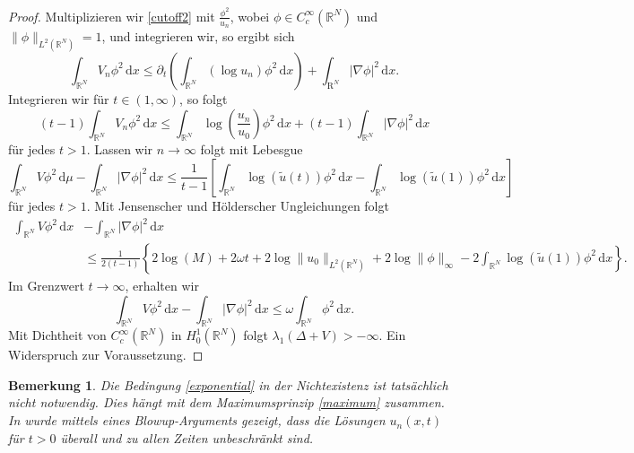 \documentclass[11pt,twoside,a4paper]{article}
\theoremstyle{break}
\newtheorem{nt}[thm]{Bemerkung}
\begin{document}
\begin{proof}
Multiplizieren wir \eqref{cutoff2} mit $\frac{\phi^2}{u_n}$, wobei $\phi\in C_c^\infty(\mathbb R^N)$ und $\| \phi \|_{L^2(\mathbb R^N)}=1$, und integrieren wir, so ergibt sich
\begin{equation}
\int_{\mathbb R^N} V_n \phi^2\, \mathrm dx \le \partial_t \left ( \int_{\mathbb R^N} (\log u_n) \phi^2\, \mathrm dx \right )+ \int_{\mathrm R^N} |\nabla \phi|^2\, \mathrm dx.
\end{equation}
Integrieren wir f\"ur $t\in (1,\infty)$, so folgt
\begin{equation}
(t-1) \int_{\mathbb R^N} V_n \phi^2\, \mathrm dx \le \int_{\mathbb R^N} \log \left ( \frac{u_n}{u_0} \right )\phi^2\, \mathrm dx + (t-1) \int_{\mathbb R^N}|\nabla \phi|^2\, \mathrm dx
\end{equation}
für jedes $t>1$. Lassen wir $n\to \infty$ folgt mit Lebesgue
\begin{equation}
\int_{\mathbb R^N} V\phi^2 \, \mathrm d\mu - \int_{\mathbb R^N} |\nabla \phi|^2 \, \mathrm dx \le \frac{1}{t-1} \left [ \int_{\mathbb R^N} \log(\tilde u(t)) \phi^2 \, \mathrm dx -\int_{\mathbb R^N} \log(\tilde u(1))\phi^2\, \mathrm dx \right ]
\end{equation}
für jedes $t>1$. Mit Jensenscher und Hölderscher Ungleichungen folgt
\begin{align*}
\int_{\mathbb R^N} V\phi^2 \, \mathrm dx &- \int_{\mathbb R^N} |\nabla \phi|^2\, \mathrm dx \\
 &\le  \frac{1}{2(t-1)} \left \{ 2\log(M) + 2\omega t + 2\log\|u_0\|_{L^2(\mathbb R^N)} + 2 \log \|\phi\|_\infty - 2\int_{\mathbb R^N} \log(\tilde u(1))\phi^2\, \mathrm dx \right \}.
\end{align*}
Im Grenzwert $t\to \infty$, erhalten wir
\begin{equation}
\int_{\mathbb R^N} V\phi^2\, \mathrm dx - \int_{\mathbb R^N} |\nabla \phi|^2\, \mathrm dx \le \omega \int_{\mathbb R^N} \phi^2\, \mathrm dx.
\end{equation}
Mit Dichtheit von $C_c^\infty(\mathbb R^N)$ in $H_0^1(\mathbb R^N)$ folgt $\lambda_1(\Delta +V) >-\infty$. Ein Widerspruch zur Voraussetzung.
\end{proof}
\begin{nt}\label{bem}
Die Bedingung \eqref{exponential} in der Nichtexistenz ist tatsächlich nicht notwendig. Dies hängt mit dem Maximumsprinzip \eqref{maximum} zusammen. In \cite{baras-goldstein} wurde mittels eines Blowup-Arguments gezeigt, dass die Lösungen $u_n(x,t)$ für $t>0$ überall und zu allen Zeiten unbeschränkt sind.
\end{nt}
\end{document}
